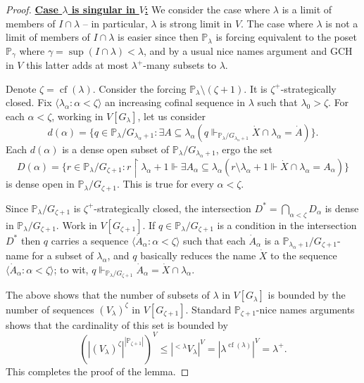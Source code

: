 \documentclass[11pt]{amsart}
\renewcommand{\restriction}{\mathbin\upharpoonright}    %
\theoremstyle{definition}
\newcounter{condition}
\theoremstyle{remark}
\newcommand\<{{<}}
\def\forces{\Vdash}
\DeclareMathOperator{\cf}{cf}
\newcommand{\po}{\mathbb{P}}
\newcommand{\la}{\langle}
\newcommand{\ra}{\rangle}
\begin{document}
\begin{proof}
   \underline{\textbf{Case $\lambda$ is singular in $V$:}} %
   We consider  the case where $\lambda$ is a limit of members of $I\cap \lambda$ -- in particular, $\lambda$ is  strong limit in $V$. The case where $\lambda$ is not a limit of members of $I\cap \lambda$ is easier since then $\po_\lambda$ is forcing equivalent to the poset $\po_\gamma$ where $\gamma = \sup(I\cap \lambda)< \lambda$, and by a usual nice names argument and GCH in $V$ this latter adds at most $\lambda^+$-many subsets to $\lambda$.
    
    Denote $\zeta = \cf(\lambda)$. Consider the forcing $\po_\lambda\setminus (\zeta+1)$. It is $\zeta^{+}$-strategically closed. Fix $\la \lambda_\alpha \colon \alpha<\zeta \ra$ an increasing cofinal sequence in $\lambda$ such that $\lambda_0 > \zeta$. For each $\alpha<\zeta$, working in $V[G_\lambda]$, let us consider
    $$d(\alpha) = \{  q\in \po_\lambda/G_{\lambda_\alpha+1} \colon \exists A\subseteq \lambda_\alpha  (q\Vdash_{\mathbb{P}_\lambda/G_{\lambda_\alpha+1}} \dot{X}\cap\lambda_\alpha = \dot{A}) \}.$$
    Each $d(\alpha)$ is a dense open subset of $\po_\lambda/G_{ \lambda_\alpha+1}$, ergo the set %
    $$ D(\alpha) = \{  r\in \po_\lambda/G_{\zeta+1} \colon r\restriction \lambda_\alpha +1 \Vdash \exists A_\alpha\subseteq \lambda_\alpha  ( r\setminus \lambda_\alpha+1 \Vdash \dot{X}\cap \lambda_\alpha = A_\alpha) \} $$
    is dense open in $\po_\lambda/G_{\zeta+1}$. This is true for every $\alpha<\zeta$. 
    
    Since $\po_\lambda/G_{\zeta+1}$ is $\zeta^{+}$-strategically closed, the intersection $D^* = \bigcap_{\alpha<\zeta} D_\alpha$ is dense in $\po_\lambda/G_{\zeta+1}$. Work in $V[G_{\zeta+1}]$. If $q\in \po_\lambda/G_{\zeta+1}$ is a condition in the intersection $D^*$ then $q$ carries a sequence $\la \dot{A}_\alpha \colon \alpha<\zeta\ra$ such that each $\dot{A}_\alpha$ is a $\po_{\lambda_\alpha+1}/G_{\zeta+1}$-name for a subset of $\lambda_\alpha$, and $q$ basically reduces the name $\dot{X}$ to the sequence $\langle \dot{A}_\alpha \colon \alpha<\zeta \rangle$; to wit, $q\forces_{\mathbb{P}_\lambda/G_{\zeta+1}}\dot{A}_\alpha=\dot{X}\cap \lambda_\alpha$. 
    
    The above shows that the number of subsets of $\lambda$ in $V[G_\lambda]$ is bounded by the number of sequences $(V_\lambda)^{\zeta}$ in $V[G_{\zeta+1}]$. Standard $\mathbb{P}_{\zeta+1}$-nice names arguments shows that the cardinality of this set is bounded by
    $$\left(|(V_\lambda)^{\zeta}|^{|\mathbb{P}_{\zeta+1}|}\right)^V\leq |{}^{<\lambda}V_\lambda|^V=|\lambda^{\cf(\lambda)}|^V=\lambda^+.$$
    This completes the proof of the lemma.
   
\end{proof}
\end{document}

